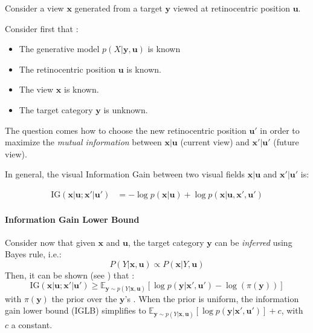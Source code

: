 Consider a view $\boldsymbol{x}$ generated from a target $\boldsymbol{y}$ viewed at retinocentric position $\boldsymbol{u}$.

Consider first that :
\begin{itemize}
	\item The generative model  $p(X|\boldsymbol{y}, \boldsymbol{u})$ is known
	\item The retinocentric position  $\boldsymbol{u}$ is known.
	\item The view $\boldsymbol{x}$ is known.
	\item The target category  $\boldsymbol{y}$ is unknown.
\end{itemize}



The question comes how to choose the new retinocentric position $\boldsymbol{u}'$ in order to maximize the \emph{mutual information} between $\boldsymbol{x}|\boldsymbol{u}$ (current view) and $\boldsymbol{x}'|\boldsymbol{u}'$ (future view).

In general, the visual Information Gain between two visual fields $\boldsymbol{x}|\boldsymbol{u}$  and $\boldsymbol{x}'|\boldsymbol{u}'$ is:

\begin{align*}
\text{IG}(\boldsymbol{x}|\boldsymbol{u}; \boldsymbol{x}'| \boldsymbol{u}')
&= -\log p(\boldsymbol{x}|\boldsymbol{u})
+ \log p(\boldsymbol{x}|\boldsymbol{u}, \boldsymbol{x}', \boldsymbol{u}')
\end{align*}

\paragraph{Information Gain Lower Bound}
Consider now that given  $\boldsymbol{x}$ and $\boldsymbol{u}$, the target category  $\boldsymbol{y}$ can be \emph{inferred} using Bayes rule, i.e.:
$$ P(Y|\boldsymbol{x}, \boldsymbol{u}) \propto  P(\boldsymbol{x}|Y, \boldsymbol{u}) $$
Then, it can be shown (see \cite{Dauce18}) that :
$$\text{IG}(\boldsymbol{x}|\boldsymbol{u}; \boldsymbol{x}'| \boldsymbol{u}') \geq \mathbb{E}_{\boldsymbol{y}\sim p(Y|\boldsymbol{x}, \boldsymbol{u})} \left[\log p(\boldsymbol{y}|\boldsymbol{x}', \boldsymbol{u}') - \log(\pi(\boldsymbol{y})) \right]$$
with  $\pi(\boldsymbol{y})$ the prior over the $\boldsymbol{y}$'s .
When the prior is uniform, the information gain lower bound (IGLB) simplifies to $\mathbb{E}_{\boldsymbol{y}\sim p(Y|\boldsymbol{x}, \boldsymbol{u})} \left[\log p(\boldsymbol{y}|\boldsymbol{x}', \boldsymbol{u}')\right] + c$, with $c$ a constant.

